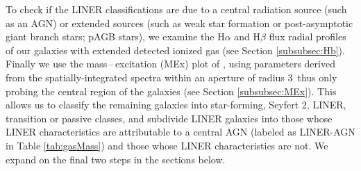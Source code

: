 \documentclass[a4paper,fleqn,usenatbib]{mnras}
\begin{document}
		To check if the LINER classifications are due to a central radiation source (such as an AGN) or extended sources (such as weak star formation or post-asymptotic giant branch stars; pAGB stars), we examine the H$\alpha$ and H$\beta$ flux radial profiles of our galaxies with extended detected ionized gas (see Section \ref{subsubsec:Hb}). Finally we use the mass\,--\,excitation (MEx) plot of \cite{Nyland2016}, using parameters derived from the spatially-integrated spectra within an aperture of radius 3\arcsec\ thus only probing the central region of the galaxies (see Section \ref{subsubsec:MEx}). This allows us to classify the remaining galaxies into star-forming, Seyfert 2, LINER, transition or passive classes, and subdivide LINER galaxies into those whose LINER characteristics are attributable to a central AGN (labeled as LINER-AGN in Table \ref{tab:gasMass}) and those whose LINER characteristics are not. We expand on the final two steps in the sections below. 





\end{document}
